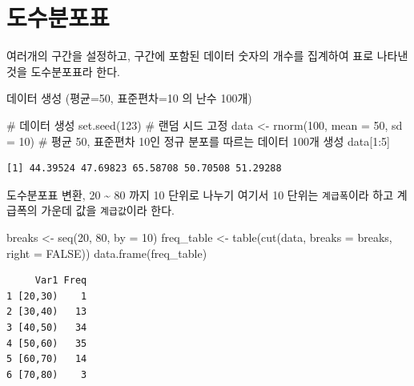 \documentclass[
  letterpaper,
  DIV=11,
  numbers=noendperiod]{scrreprt}
\newenvironment{Shaded}{\begin{snugshade}}{\end{snugshade}}
\newcommand{\AttributeTok}[1]{\textcolor[rgb]{0.40,0.45,0.13}{#1}}
\newcommand{\CommentTok}[1]{\textcolor[rgb]{0.37,0.37,0.37}{#1}}
\newcommand{\ConstantTok}[1]{\textcolor[rgb]{0.56,0.35,0.01}{#1}}
\newcommand{\DecValTok}[1]{\textcolor[rgb]{0.68,0.00,0.00}{#1}}
\newcommand{\FunctionTok}[1]{\textcolor[rgb]{0.28,0.35,0.67}{#1}}
\newcommand{\NormalTok}[1]{\textcolor[rgb]{0.00,0.23,0.31}{#1}}
\newcommand{\OtherTok}[1]{\textcolor[rgb]{0.00,0.23,0.31}{#1}}
\newcommand{\SpecialCharTok}[1]{\textcolor[rgb]{0.37,0.37,0.37}{#1}}
\begin{document}
\hypertarget{uxb3c4uxc218uxbd84uxd3ecuxd45c}{%
\section{도수분포표}\label{uxb3c4uxc218uxbd84uxd3ecuxd45c}}

여러개의 구간을 설정하고, 구간에 포함된 데이터 숫자의 개수를 집계하여
표로 나타낸 것을 도수분포표라 한다.

데이터 생성 (평균=50, 표준편차=10 의 난수 100개)

\begin{Shaded}
\begin{Highlighting}[]
\CommentTok{\# 데이터 생성}
\FunctionTok{set.seed}\NormalTok{(}\DecValTok{123}\NormalTok{) }\CommentTok{\# 랜덤 시드 고정}
\NormalTok{data }\OtherTok{\textless{}{-}} \FunctionTok{rnorm}\NormalTok{(}\DecValTok{100}\NormalTok{, }\AttributeTok{mean =} \DecValTok{50}\NormalTok{, }\AttributeTok{sd =} \DecValTok{10}\NormalTok{) }\CommentTok{\# 평균 50, 표준편차 10인 정규 분포를 따르는 데이터 100개 생성}
\NormalTok{data[}\DecValTok{1}\SpecialCharTok{:}\DecValTok{5}\NormalTok{]}
\end{Highlighting}
\end{Shaded}

\begin{verbatim}
[1] 44.39524 47.69823 65.58708 50.70508 51.29288
\end{verbatim}

도수분포표 변환, 20 \textasciitilde{} 80 까지 10 단위로 나누기 여기서 10
단위는 \texttt{계급폭}이라 하고 계급폭의 가운데 값을 \texttt{계급값}이라
한다.

\begin{Shaded}
\begin{Highlighting}[]
\NormalTok{breaks }\OtherTok{\textless{}{-}} \FunctionTok{seq}\NormalTok{(}\DecValTok{20}\NormalTok{, }\DecValTok{80}\NormalTok{, }\AttributeTok{by =} \DecValTok{10}\NormalTok{)}
\NormalTok{freq\_table }\OtherTok{\textless{}{-}} \FunctionTok{table}\NormalTok{(}\FunctionTok{cut}\NormalTok{(data, }\AttributeTok{breaks =}\NormalTok{ breaks, }\AttributeTok{right =} \ConstantTok{FALSE}\NormalTok{))}
\FunctionTok{data.frame}\NormalTok{(freq\_table)}
\end{Highlighting}
\end{Shaded}

\begin{verbatim}
     Var1 Freq
1 [20,30)    1
2 [30,40)   13
3 [40,50)   34
4 [50,60)   35
5 [60,70)   14
6 [70,80)    3
\end{verbatim}
\end{document}
